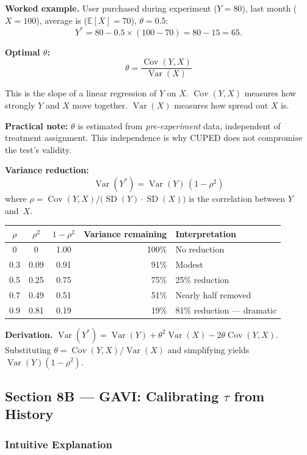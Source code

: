 \documentclass[12pt, a4paper]{article}
\newcommand{\E}{\mathbb{E}}            %
\newcommand{\Var}{\operatorname{Var}}
\newcommand{\Cov}{\operatorname{Cov}}
\newcommand{\SD}{\operatorname{SD}}
\begin{document}
\textbf{Worked example.}
User purchased  during experiment ($Y=80$),  last
month ($X=100$), average is  ($\E[X]=70$), $\theta = 0.5$:
\[
  Y^* = 80 - 0.5 \times (100 - 70) = 80 - 15 = 65.
\]

\textbf{Optimal $\theta$:}
\[
  \boxed{\theta = \frac{\Cov(Y,X)}{\Var(X)}}
\]

\begin{plainlanguage}
This is the slope of a linear regression of $Y$ on $X$.
$\Cov(Y,X)$ measures how strongly $Y$ and $X$ move together.
$\Var(X)$ measures how spread out $X$ is.
\end{plainlanguage}

\textbf{Practical note:} $\theta$ is estimated from \emph{pre-experiment}
data, independent of treatment assignment.  This independence is why CUPED
does not compromise the test's validity.

\textbf{Variance reduction:}
\[
  \boxed{\Var(Y^*) = \Var(Y)\,(1 - \rho^2)}
\]
where $\rho = \Cov(Y,X) / \bigl(\SD(Y)\cdot\SD(X)\bigr)$ is the correlation
between $Y$ and~$X$.

\begin{center}
\begin{tabular}{@{} c c c r l @{}}
\toprule
$\rho$ & $\rho^2$ & $1-\rho^2$
       & \textbf{Variance remaining} & \textbf{Interpretation} \\
\midrule
0   & 0    & 1.00 & 100\% & No reduction \\
0.3 & 0.09 & 0.91 & 91\%  & Modest \\
0.5 & 0.25 & 0.75 & 75\%  & 25\% reduction \\
0.7 & 0.49 & 0.51 & 51\%  & Nearly half removed \\
0.9 & 0.81 & 0.19 & 19\%  & 81\% reduction --- dramatic \\
\bottomrule
\end{tabular}
\end{center}

\textbf{Derivation.}
$\Var(Y^*) = \Var(Y) + \theta^2\Var(X) - 2\theta\Cov(Y,X)$.
Substituting $\theta = \Cov(Y,X)/\Var(X)$ and simplifying yields
$\Var(Y)(1-\rho^2)$.

\subsection{Section 8B --- GAVI: Calibrating $\tau$ from History}

\subsubsection*{Intuitive Explanation}
\end{document}
